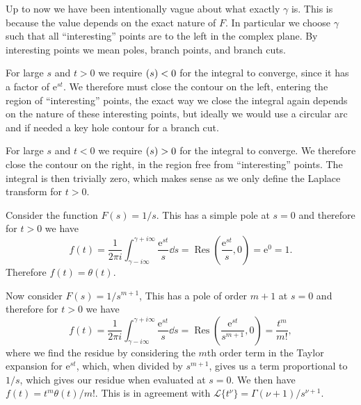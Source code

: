 \documentclass[fleqn]{NotesClass}
\newcommand*{\e}{\mathrm{e}}
\DeclareMathOperator{\Res}{Res}
\let\Re\relax
\DeclareMathOperator{\Re}{Re}
\newcommand*{\laplaceTransform}{\mathcal{L}}
\begin{document}
    Up to now we have been intentionally vague about what exactly \(\gamma\) is.
    This is because the value depends on the exact nature of \(F\).
    In particular we choose \(\gamma\) such that all \enquote{interesting} points are to the left in the complex plane.
    By interesting points we mean poles, branch points, and branch cuts.
    
    For large \(s\) and \(t > 0\) we require \(\Re(s) < 0\) for the integral to converge, since it has a factor of \(\e^{st}\).
    We therefore must close the contour on the left, entering the region of \enquote{interesting} points, the exact way we close the integral again depends on the nature of these interesting points, but ideally we would use a circular arc and if needed a key hole contour for a branch cut.
    
    For large \(s\) and \(t < 0\) we require \(\Re(s) > 0\) for the integral to converge.
    We therefore close the contour on the right, in the region free from \enquote{interesting} points.
    The integral is then trivially zero, which makes sense as we only define the Laplace transform for \(t > 0\).
    
    \begin{exm}{}{}
        Consider the function \(F(s) = 1/s\).
        This has a simple pole at \(s = 0\) and therefore for \(t > 0\) we have
        \begin{equation}
            f(t) = \frac{1}{2\pi i}\int_{\gamma - i\infty}^{\gamma + i\infty} \frac{\e^{st}}{s} \dd{s} = \Res\left( \frac{\e^{st}}{s}, 0 \right) = \e^{0} = 1.
        \end{equation}
        Therefore \(f(t) = \theta(t)\).
        
        Now consider \(F(s) = 1/s^{m+1}\),
        This has a pole of order \(m + 1\) at \(s = 0\) and therefore for \(t > 0\) we have
        \begin{equation}
            f(t) = \frac{1}{2\pi i}\int_{\gamma - i\infty}^{\gamma + i\infty} \frac{\e^{st}}{s} \dd{s} = \Res\left( \frac{\e^{st}}{s^{m+1}}, 0 \right) = \frac{t^m}{m!},
        \end{equation}
        where we find the residue by considering the \(m\)th order term in the Taylor expansion for \(\e^{st}\), which, when divided by \(s^{m+1}\), gives us a term proportional to \(1/s\), which gives our residue when evaluated at \(s = 0\).
        We then have \(f(t) = t^m\theta(t)/m!\).
        This is in agreement with \(\laplaceTransform\{t^\nu\} = \Gamma(\nu + 1) / s^{\nu + 1}\).
    \end{exm}
    
\end{document}
